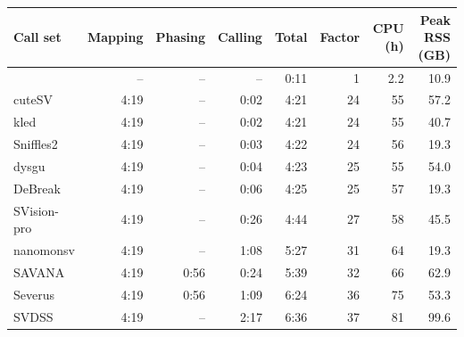 \begin{tabular}{lrrrrrrr}
\toprule
Call set & Mapping & Phasing & Calling & Total & Factor & CPU (h) & Peak RSS (GB) \\
\midrule
\tool{} & -- & -- & -- & 0:11 & 1 & 2.2 & 10.9 \\
cuteSV & 4:19 & -- & 0:02 & 4:21 & 24 & 55 & 57.2 \\
kled & 4:19 & -- & 0:02 & 4:21 & 24 & 55 & 40.7 \\
Sniffles2 & 4:19 & -- & 0:03 & 4:22 & 24 & 56 & 19.3 \\
dysgu & 4:19 & -- & 0:04 & 4:23 & 25 & 55 & 54.0 \\
DeBreak & 4:19 & -- & 0:06 & 4:25 & 25 & 57 & 19.3 \\
SVision-pro & 4:19 & -- & 0:26 & 4:44 & 27 & 58 & 45.5 \\
nanomonsv & 4:19 & -- & 1:08 & 5:27 & 31 & 64 & 19.3 \\
SAVANA & 4:19 & 0:56 & 0:24 & 5:39 & 32 & 66 & 62.9 \\
Severus & 4:19 & 0:56 & 1:09 & 6:24 & 36 & 75 & 53.3 \\
SVDSS & 4:19 & -- & 2:17 & 6:36 & 37 & 81 & 99.6 \\
\bottomrule
\end{tabular}
